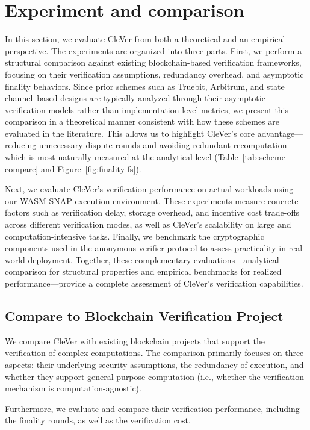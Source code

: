 \documentclass[3p]{elsarticle}
\theoremstyle{remark}
\begin{document}
\section{Experiment and comparison}

In this section, we evaluate CleVer from both a theoretical and an empirical perspective. The experiments are organized into three parts. First, we perform a structural comparison against existing blockchain-based verification frameworks, focusing on their verification assumptions, redundancy overhead, and asymptotic finality behaviors. Since prior schemes such as Truebit, Arbitrum, and state channel–based designs are typically analyzed through their asymptotic verification models rather than implementation-level metrics, we present this comparison in a theoretical manner consistent with how these schemes are evaluated in the literature. This allows us to highlight CleVer’s core advantage—reducing unnecessary dispute rounds and avoiding redundant recomputation—which is most naturally measured at the analytical level (Table~\ref{tab:scheme-compare} and Figure~\ref{fig:finality-fs}). 

Next, we evaluate CleVer’s verification performance on actual workloads using our WASM-SNAP execution environment. These experiments measure concrete factors such as verification delay, storage overhead, and incentive cost trade-offs across different verification modes, as well as CleVer’s scalability on large and computation-intensive tasks. Finally, we benchmark the cryptographic components used in the anonymous verifier protocol to assess practicality in real-world deployment. Together, these complementary evaluations—analytical comparison for structural properties and empirical benchmarks for realized performance—provide a complete assessment of CleVer’s verification capabilities.

\subsection{Compare to Blockchain Verification Project}

We compare CleVer with existing blockchain projects that support the verification of complex computations. The comparison primarily focuses on three aspects: their underlying security assumptions, the redundancy of execution, and whether they support general-purpose computation (i.e., whether the verification mechanism is computation-agnostic).

Furthermore, we evaluate and compare their verification performance, including the finality rounds, as well as the verification cost.
\end{document}
